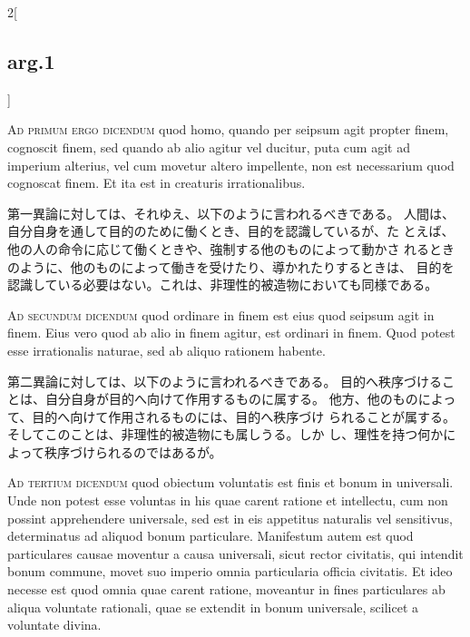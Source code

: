 \documentclass[paper=a4paper,fontsize=10pt,jafontsize=9pt,titlepage]{jlreq}
\begin{document}
\begin{paracol}{2}[\subsection{arg.1}]
\switchcolumn*[\subsection{ad.1}]

{\scshape Ad primum ergo dicendum} quod homo, quando
per seipsum agit propter finem, cognoscit finem, sed quando ab alio
agitur vel ducitur, puta cum agit ad imperium alterius, vel cum movetur
altero impellente, non est necessarium quod cognoscat finem. Et ita est
in creaturis irrationalibus.

\switchcolumn

第一異論に対しては、それゆえ、以下のように言われるべきである。
 人間は、自分自身を通して目的のために働くとき、目的を認識しているが、た
 とえば、他の人の命令に応じて働くときや、強制する他のものによって動かさ
 れるときのように、他のものによって働きを受けたり、導かれたりするときは、
 目的を認識している必要はない。これは、非理性的被造物においても同様である。

\switchcolumn*[\subsection{ad.2}]

{\scshape Ad secundum dicendum} quod ordinare in
finem est eius quod seipsum agit in finem. Eius vero quod ab alio in
finem agitur, est ordinari in finem. Quod potest esse irrationalis
naturae, sed ab aliquo rationem habente.

\switchcolumn

第二異論に対しては、以下のように言われるべきである。
 目的へ秩序づけることは、自分自身が目的へ向けて作用するものに属する。
 他方、他のものによって、目的へ向けて作用されるものには、目的へ秩序づけ
 られることが属する。そしてこのことは、非理性的被造物にも属しうる。しか
 し、理性を持つ何かによって秩序づけられるのではあるが。

\switchcolumn*[\subsection{ad.3}]

{\scshape Ad tertium dicendum} quod obiectum
voluntatis est finis et bonum in universali. Unde non potest esse
voluntas in his quae carent ratione et intellectu, cum non possint
apprehendere universale, sed est in eis appetitus naturalis vel
sensitivus, determinatus ad aliquod bonum particulare. Manifestum autem
est quod particulares causae moventur a causa universali, sicut rector
civitatis, qui intendit bonum commune, movet suo imperio omnia
particularia officia civitatis. Et ideo necesse est quod omnia quae
carent ratione, moveantur in fines particulares ab aliqua voluntate
rationali, quae se extendit in bonum universale, scilicet a voluntate
divina.


\end{paracol}
\end{document}
